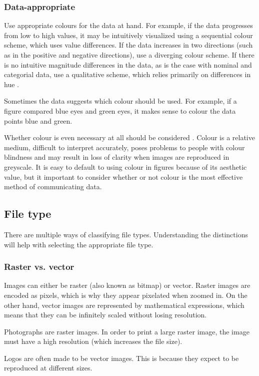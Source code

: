 \documentclass[letterpaper]{article}
\begin{document}
\subsubsection{Data-appropriate}
Use appropriate colours for the data at hand. For example, if the data progresses from low to high values, it may be intuitively visualized using a sequential colour scheme, which uses value differences. If the data increases in two directions (such as in the positive and negative directions), use a diverging colour scheme. If there is no intuitive magnitude differences in the data, as is the case with nominal and categorial data, use a qualitative scheme, which relies primarily on differences in hue \cite{colorbrewer}.

Sometimes the data suggests which colour should be used. For example, if a figure compared blue eyes and green eyes, it makes sense to colour the data points blue and green.

Whether colour is even necessary at all should be considered \cite{wong-avoid-colour}. Colour is a relative medium, difficult to interpret accurately, poses problems to people with colour blindness and may result in loss of clarity when images are reproduced in greyscale. It is easy to default to using colour in figures because of its aesthetic value, but it important to consider whether or not colour is the most effective method of communicating data.

\subsection{File type}
There are multiple ways of classifying file types. Understanding the distinctions will help with selecting the appropriate file type.

\subsubsection{Raster vs. vector}
Images can either be raster (also known as bitmap) or vector. Raster images are encoded as pixels, which is why they appear pixelated when zoomed in. On the other hand, vector images are represented by mathematical expressions, which means that they can be infinitely scaled without losing resolution. 

Photographs are raster images. In order to print a large raster image, the image must have a high resolution (which increases the file size). 

Logos are often made to be vector images. This is because they expect to be reproduced at different sizes. 
\end{document}
